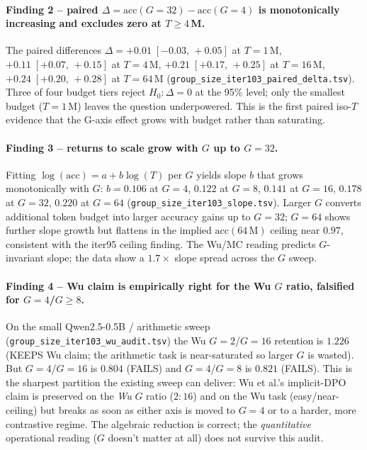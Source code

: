 \paragraph{Finding 2 -- paired $\Delta = \mathrm{acc}(G{=}32) - \mathrm{acc}(G{=}4)$
is monotonically increasing and excludes zero at $T{\ge}4\,$M.}
The paired differences
$\Delta = +0.01\;[-0.03,\,+0.05]$ at $T{=}1\,$M,
$+0.11\;[+0.07,\,+0.15]$ at $T{=}4\,$M,
$+0.21\;[+0.17,\,+0.25]$ at $T{=}16\,$M,
$+0.24\;[+0.20,\,+0.28]$ at $T{=}64\,$M
(\texttt{group\_size\_iter103\_paired\_delta.tsv}).  Three of four
budget tiers reject $H_0: \Delta = 0$ at the 95\% level; only the
smallest budget ($T{=}1\,$M) leaves the question underpowered.
This is the first paired iso-$T$ evidence that the G-axis effect
grows with budget rather than saturating.

\paragraph{Finding 3 -- returns to scale grow with $G$ up to $G{=}32$.}
Fitting $\log(\mathrm{acc}) = a + b \log(T)$ per $G$ yields
slope $b$ that grows monotonically with $G$:
$b = 0.106$ at $G{=}4$, $0.122$ at $G{=}8$, $0.141$ at $G{=}16$,
$0.178$ at $G{=}32$, $0.220$ at $G{=}64$
(\texttt{group\_size\_iter103\_slope.tsv}).  Larger $G$ converts
additional token budget into larger accuracy gains up to $G{=}32$;
$G{=}64$ shows further slope growth but flattens in the implied
$\mathrm{acc}(64\,\mathrm{M})$ ceiling near $0.97$, consistent with
the iter95 ceiling finding.  The Wu/MC reading predicts $G$-invariant
slope; the data show a $1.7\times$ slope spread across the $G$
sweep.

\paragraph{Finding 4 -- Wu claim is empirically right for the Wu
$G$ ratio, falsified for $G{=}4$/$G{\ge}8$.}
On the small Qwen2.5-0.5B / arithmetic sweep
(\texttt{group\_size\_iter103\_wu\_audit.tsv}) the Wu $G{=}2$/$G{=}16$
retention is $1.226$ (KEEPS Wu claim; the arithmetic task is
near-saturated so larger $G$ is wasted).  But $G{=}4$/$G{=}16$ is
$0.804$ (FAILS) and $G{=}4$/$G{=}8$ is $0.821$ (FAILS).  This is the
sharpest partition the existing sweep can deliver: Wu et al.'s
implicit-DPO claim is preserved on the \emph{Wu} $G$ ratio ($2{:}16$)
and on the Wu task (easy/near-ceiling) but breaks as soon as either
axis is moved to $G{=}4$ or to a harder, more contrastive regime.
The algebraic reduction is correct; the \emph{quantitative}
operational reading ($G$ doesn't matter at all) does not survive
this audit.

